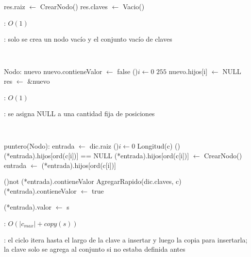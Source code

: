 \begin{Algoritmos}


	\begin{algorithm}[H]
		\NoCaptionOfAlgo
		\caption{}
		res.raiz $\leftarrow$ CrearNodo() 
		res.claves $\leftarrow$ Vacio() 
	\end{algorithm}

	\complejidad: $O(1)$

	\justifcomp: solo se crea un nodo vacío y el conjunto vacío de claves

	~

	\begin{algorithm}[H]
		\NoCaptionOfAlgo
		\caption{}
		Nodo: nuevo 
		nuevo.contieneValor $\leftarrow$ false 
		\For(){$i \leftarrow 0$ \KwTo $255$}{ 
			nuevo.hijos[i] $\leftarrow$ NULL 
		}
		res $\leftarrow$ \&nuevo 
	\end{algorithm}

	\complejidad: $O(1)$

	\justifcomp: se asigna NULL a una cantidad fija de posiciones

	~

	\begin{algorithm}[H]
		\NoCaptionOfAlgo
		\caption{}
		puntero(Nodo): entrada $\leftarrow$ dic.raiz 
		\For(){$i \leftarrow 0$ \KwTo Longitud(c)}{
			\If(){(*entrada).hijos[ord(c[i])] == NULL} {
				(*entrada).hijos[ord(c[i])] $\leftarrow$ CrearNodo() 
			}
			entrada $\leftarrow$ (*entrada).hijos[ord(c[i])] 
		}

		\If(){not (*entrada).contieneValor} {
			AgregarRapido(dic.claves, c) 
			(*entrada).contieneValor $\leftarrow$ true 
		}

		(*entrada).valor $\leftarrow$ s 
	\end{algorithm}

	\complejidad: $O(|c_{max}| + copy(s))$

	\justifcomp: el ciclo itera hasta el largo de la clave a insertar y luego la copia para insertarla; la clave solo se agrega al conjunto si no estaba definida antes


\end{Algoritmos}
